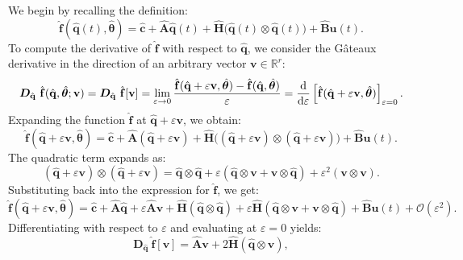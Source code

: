 We begin by recalling the definition:\\
$$
\hat{\mathbf{f}}(\hat{\mathbf{q}}(t), \hat{\bm{\theta}}) = \hat{\mathbf{c}} + \hat{\mathbf{A}}\hat{\mathbf{q}}(t) + \hat{\mathbf{H}}\bigl( \hat{\mathbf{q}}(t)\otimes \hat{\mathbf{q}}(t) \bigr) + \hat{\mathbf{B}}\mathbf{u}(t).
$$
To compute the derivative of $\hat{\mathbf{f}}$ with respect to $\hat{\mathbf{q}}$, we consider the Gâteaux derivative in the direction of an arbitrary vector $\mathbf{v}\in \mathbb{R}^r$:\\
$$
\bm{D}_{\hat{\mathbf{q}}}~\hat{\mathbf{f}}(\hat{\mathbf{q}}, \hat{\bm{\theta}}; \mathbf{v}) = \bm{D}_{\hat{\mathbf{q}}}~\hat{\mathbf{f}}[\mathbf{v}] = \lim_{\varepsilon \to 0} \frac{\hat{\mathbf{f}}(\hat{\mathbf{q}} + \varepsilon \mathbf{v}, \hat{\bm{\theta}}) - \hat{\mathbf{f}}(\hat{\mathbf{q}}, \hat{\bm{\theta}})}{\varepsilon} = \dv{}{\varepsilon} \left[ \hat{\mathbf{f}}(\hat{\mathbf{q}} + \varepsilon \mathbf{v}, \hat{\bm{\theta}}) \right]_{\varepsilon = 0}.
$$
Expanding the function $\hat{\mathbf{f}}$ at $\hat{\mathbf{q}} + \varepsilon \mathbf{v}$, we obtain:\\
$$
\hat{\mathbf{f}}(\hat{\mathbf{q}} + \varepsilon \mathbf{v}, \hat{\bm{\theta}}) = \hat{\mathbf{c}} + \hat{\mathbf{A}}(\hat{\mathbf{q}} + \varepsilon \mathbf{v}) + \hat{\mathbf{H}}\bigl( (\hat{\mathbf{q}} + \varepsilon \mathbf{v}) \otimes (\hat{\mathbf{q}} + \varepsilon \mathbf{v}) \bigr) + \hat{\mathbf{B}}\mathbf{u}(t).
$$
The quadratic term expands as:\\
$$
(\hat{\mathbf{q}} + \varepsilon \mathbf{v}) \otimes (\hat{\mathbf{q}} + \varepsilon \mathbf{v}) = \hat{\mathbf{q}} \otimes \hat{\mathbf{q}} + \varepsilon (\hat{\mathbf{q}} \otimes \mathbf{v} + \mathbf{v} \otimes \hat{\mathbf{q}}) + \varepsilon^2 (\mathbf{v} \otimes \mathbf{v}).
$$
Substituting back into the expression for $\hat{\mathbf{f}}$, we get:\\
$$
\hat{\mathbf{f}}(\hat{\mathbf{q}} + \varepsilon \mathbf{v}, \hat{\bm{\theta}}) = \hat{\mathbf{c}} + \hat{\mathbf{A}}\hat{\mathbf{q}} + \varepsilon \hat{\mathbf{A}}\mathbf{v} + \hat{\mathbf{H}}(\hat{\mathbf{q}} \otimes \hat{\mathbf{q}}) + \varepsilon \hat{\mathbf{H}}(\hat{\mathbf{q}} \otimes \mathbf{v} + \mathbf{v} \otimes \hat{\mathbf{q}}) + \hat{\mathbf{B}}\mathbf{u}(t) + \mathcal{O}(\varepsilon^2).
$$
Differentiating with respect to $\varepsilon$ and evaluating at $\varepsilon = 0$ yields:\\
$$
\bm{D}_{\hat{\mathbf{q}}}~\hat{\mathbf{f}}[\mathbf{v}] = \hat{\mathbf{A}}\mathbf{v} + 2\hat{\mathbf{H}}(\hat{\mathbf{q}} \otimes \mathbf{v}),
$$
